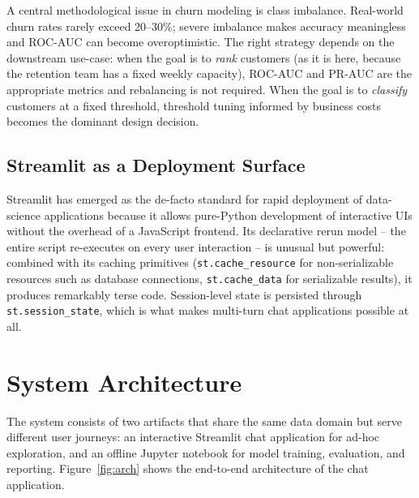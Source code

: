 \documentclass[11pt,a4paper]{article}
\begin{document}
A central methodological issue in churn modeling is class imbalance.
Real-world churn rates rarely exceed 20--30\%; severe imbalance makes
accuracy meaningless and ROC-AUC can become overoptimistic. The right
strategy depends on the downstream use-case: when the goal is to
\emph{rank} customers (as it is here, because the retention team has a
fixed weekly capacity), ROC-AUC and PR-AUC are the appropriate metrics
and rebalancing is not required. When the goal is to \emph{classify}
customers at a fixed threshold, threshold tuning informed by business
costs becomes the dominant design decision.

\subsection{Streamlit as a Deployment Surface}

Streamlit has emerged as the de-facto standard for rapid deployment of
data-science applications because it allows pure-Python development of
interactive UIs without the overhead of a JavaScript frontend. Its
declarative rerun model -- the entire script re-executes on every user
interaction -- is unusual but powerful: combined with its caching
primitives (\texttt{st.cache\_resource} for non-serializable resources
such as database connections, \texttt{st.cache\_data} for serializable
results), it produces remarkably terse code. Session-level state is
persisted through \texttt{st.session\_state}, which is what makes
multi-turn chat applications possible at all.

\section{System Architecture}

The system consists of two artifacts that share the same data domain
but serve different user journeys: an interactive Streamlit chat
application for ad-hoc exploration, and an offline Jupyter notebook for
model training, evaluation, and reporting. Figure~\ref{fig:arch} shows
the end-to-end architecture of the chat application.
\end{document}
